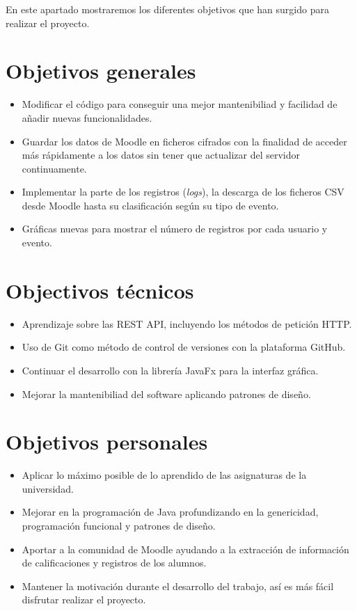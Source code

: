 
En este apartado mostraremos los diferentes objetivos que han surgido para realizar el proyecto.

\section{Objetivos generales}

\begin{itemize}
	\item Modificar el código para conseguir una mejor mantenibiliad y facilidad de añadir nuevas funcionalidades. 
	\item Guardar los datos de Moodle en ficheros cifrados con la finalidad de acceder más rápidamente a los datos sin tener que actualizar del servidor continuamente.
	\item Implementar la parte de los registros (\textit{logs}), la descarga de los ficheros CSV desde Moodle hasta su clasificación según su tipo de evento.
	\item Gráficas nuevas para mostrar el número de registros por cada usuario y evento.
	
\end{itemize}

\section{Objectivos técnicos}
\begin{itemize}
	\item Aprendizaje sobre las REST API, incluyendo los métodos de petición HTTP\cite{noauthor_http_nodate}.
	\item Uso de Git como método de control de versiones con la plataforma GitHub.
	\item Continuar el desarrollo con la librería JavaFx para la interfaz gráfica.
	\item Mejorar la mantenibiliad del software aplicando patrones de diseño.
\end{itemize}

\section{Objetivos personales}
\begin{itemize}
	\item Aplicar lo máximo posible de lo aprendido de las asignaturas de la universidad.
	\item Mejorar en la programación de Java profundizando en la genericidad, programación funcional y patrones de diseño.
	\item Aportar a la comunidad de Moodle ayudando a la extracción de información de calificaciones y registros de los alumnos.
	\item Mantener la motivación durante el desarrollo del trabajo, así es más fácil disfrutar realizar el proyecto.
\end{itemize}
